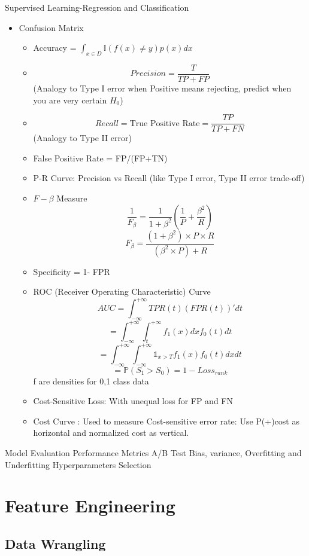 \documentclass[11pt, openany]{book}              %
\begin{document}
Supervised Learning-Regression and Classification
\begin{itemize}
    \item Confusion Matrix
    \begin{itemize}
    	\item Accuracy = $\int_{x\in D} \mathbb{I}(f(x)\neq y) p(x)dx$
    	\item $$Precision = \frac{T}{TP+FP}$$ (Analogy to Type I error when Positive means rejecting, predict when you are very certain $H_0$) 
    	\item $$Recall = \text{True Positive Rate}= \frac{TP}{TP+FN}$$(Analogy to Type II error)
    	\item False Positive Rate = FP/(FP+TN)
    	\item P-R Curve: Precision vs Recall (like Type I error, Type II error trade-off)
    	\item $F-\beta$ Measure
    	$$\frac{1}{F_{\beta}} = \frac{1}{1+\beta^2}(\frac{1}{P}+\frac{\beta^2}{R})$$
    	$${F_{\beta}} = \frac{(1+\beta^2) \times P \times R}{(\beta^2 \times P) + R}$$
    	\item Specificity = 1- FPR
    	\item ROC (Receiver Operating Characteristic) Curve
    	$$AUC = \int_{-\infty}^{+\infty}  TPR(t)(FPR(t))'dt$$
    	$$ = \int_{-\infty}^{+\infty} \int_{t}^{+\infty} f_1(x)dxf_0(t)dt$$
    	$$ = \int_{-\infty}^{+\infty}\int_{-\infty}^{+\infty} \mathbb{1}_{x>T} f_1(x) f_0(t)dxdt$$
    	$$ = \mathbb{P}(S_1 > S_0) = 1-Loss_{rank}$$ f are densities for 0,1 class data
    	\item Cost-Sensitive Loss: With unequal loss for FP and FN
    	\item Cost Curve : Used to measure Cost-sensitive error rate: Use P(+)cost as horizontal and normalized cost as vertical. 
    	
    \end{itemize}
\end{itemize}

Model Evaluation
	Performance Metrics
	A/B Test
	Bias, variance, Overfitting and Underfitting
	Hyperparameters Selection

\chapter{Feature Engineering}

\section{Data Wrangling}
\end{document}
